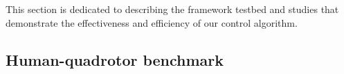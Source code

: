 This section is dedicated to describing the framework testbed and studies that demonstrate the effectiveness and efficiency of our control algorithm.
\subsection{Human-quadrotor benchmark}

